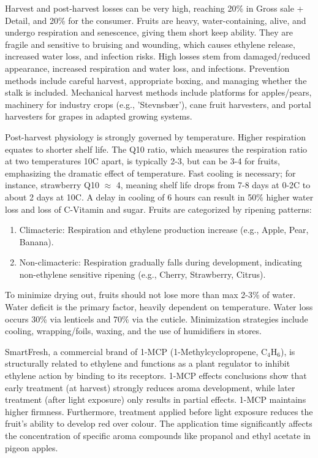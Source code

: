 \vspace{0.5em}
Harvest and post-harvest losses can be very high, reaching 20\% in Gross sale + Detail, and 20\% for the consumer. Fruits are heavy, water-containing, alive, and undergo respiration and senescence, giving them short keep ability. They are fragile and sensitive to bruising and wounding, which causes ethylene release, increased water loss, and infection risks. High losses stem from damaged/reduced appearance, increased respiration and water loss, and infections. Prevention methods include careful harvest, appropriate boxing, and managing whether the stalk is included. Mechanical harvest methods include platforms for apples/pears, machinery for industry crops (e.g., 'Stevnsbær'), cane fruit harvesters, and portal harvesters for grapes in adapted growing systems.

\vspace{0.5em}
Post-harvest physiology is strongly governed by temperature. Higher respiration equates to shorter shelf life. The Q10 ratio, which measures the respiration ratio at two temperatures 10\textdegree C apart, is typically 2-3, but can be 3-4 for fruits, emphasizing the dramatic effect of temperature. Fast cooling is necessary; for instance, strawberry Q10 $\approx$ 4, meaning shelf life drops from 7-8 days at 0-2\textdegree C to about 2 days at 10\textdegree C. A delay in cooling of 6 hours can result in 50\% higher water loss and loss of C-Vitamin and sugar. Fruits are categorized by ripening patterns: \begin{enumerate} \item Climacteric: Respiration and ethylene production increase (e.g., Apple, Pear, Banana). \item Non-climacteric: Respiration gradually falls during development, indicating non-ethylene sensitive ripening (e.g., Cherry, Strawberry, Citrus). \end{enumerate} To minimize drying out, fruits should not lose more than max 2-3\% of water. Water deficit is the primary factor, heavily dependent on temperature. Water loss occurs 30\% via lenticels and 70\% via the cuticle. Minimization strategies include cooling, wrapping/foils, waxing, and the use of humidifiers in stores.

\vspace{0.5em}
SmartFresh, a commercial brand of 1-MCP (1-Methylcyclopropene, C$_4$H$_6$), is structurally related to ethylene and functions as a plant regulator to inhibit ethylene action by binding to its receptors. 1-MCP effects conclusions show that early treatment (at harvest) strongly reduces aroma development, while later treatment (after light exposure) only results in partial effects. 1-MCP maintains higher firmness. Furthermore, treatment applied before light exposure reduces the fruit's ability to develop red over colour. The application time significantly affects the concentration of specific aroma compounds like propanol and ethyl acetate in pigeon apples.

